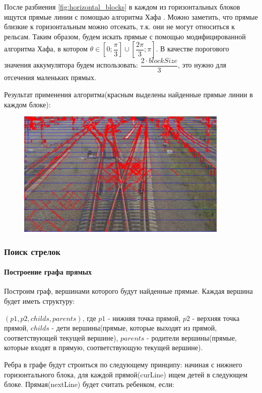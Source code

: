 После разбиения \ref{fig:horizontal_blocks} в каждом из горизонтальных блоков ищутся прямые линии с помощью алгоритма Хафа \cite{b:hough_transform}. Можно заметить, что прямые близкие к горизонтальным можно отсекать, т.к. они не могут относиться к рельсам. Таким образом, будем искать прямые с помощью модифицированной алгоритма Хафа, в котором $\theta \in [0;\dfrac{\pi}{3}] \cup [\dfrac{2\pi}{3};\pi]$. В качестве порогового значения аккумулятора будем использовать: $\dfrac{2\cdot blockSize}{3}$, это нужно для отсечения маленьких прямых.

Результат применения алгоритма(красным выделены найденные прямые линии в каждом блоке):
\begin{figure}[!h]
	\centering
	\includegraphics[width=0.9\textwidth]{pictures/hough_lines_res}
	\caption[Результат применения алгоритма]{}
	\label{fig:houghlinesres}
\end{figure}

\subsubsection{Поиск стрелок}
\paragraph{Построение графа прямых}
\label{line_graph}

Построим граф, вершинами которого будут найденные прямые. Каждая вершина будет иметь структуру: 

$(p1, p2, childs, parents)$, где $p1$ - нижняя точка прямой, $p2$ - верхняя точка прямой, $childs$ - дети вершины(прямые, которые выходят из прямой, соответствующей текущей вершине), $parents$ - родители вершины(прямые, которые входят в прямую, соответствующую текущей вершине). 

Ребра в графе будут строиться по следующему принципу: начиная с нижнего горизонтального блока, для каждой прямой(curLine) ищем детей в следующем блоке. Прямая(nextLine) будет считать ребенком, если:

